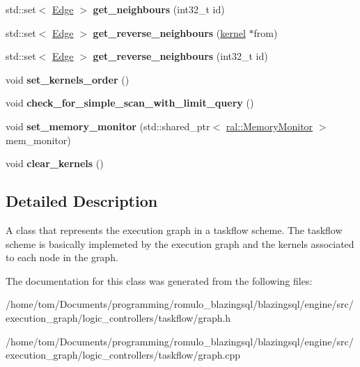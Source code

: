 \begin{DoxyCompactItemize}
\item 
\mbox{\label{classral_1_1cache_1_1graph_a1033a6785724eece7f7d9f6db1cec377}} 
std\+::set$<$ \hyperlink{structral_1_1cache_1_1graph_1_1Edge}{Edge} $>$ {\bfseries get\+\_\+neighbours} (int32\+\_\+t id)
\item 
\mbox{\label{classral_1_1cache_1_1graph_a2b51ef8a39906835c618f9fe2e886aac}} 
std\+::set$<$ \hyperlink{structral_1_1cache_1_1graph_1_1Edge}{Edge} $>$ {\bfseries get\+\_\+reverse\+\_\+neighbours} (\hyperlink{classral_1_1cache_1_1kernel}{kernel} $\ast$from)
\item 
\mbox{\label{classral_1_1cache_1_1graph_a891d2dbc52adb2f357de241b813458b9}} 
std\+::set$<$ \hyperlink{structral_1_1cache_1_1graph_1_1Edge}{Edge} $>$ {\bfseries get\+\_\+reverse\+\_\+neighbours} (int32\+\_\+t id)
\item 
\mbox{\label{classral_1_1cache_1_1graph_ad798a6ffb25cf4be31d95ce853e19756}} 
void {\bfseries set\+\_\+kernels\+\_\+order} ()
\item 
\mbox{\label{classral_1_1cache_1_1graph_aea83249dae61539588a5bd280d8ee505}} 
void {\bfseries check\+\_\+for\+\_\+simple\+\_\+scan\+\_\+with\+\_\+limit\+\_\+query} ()
\item 
\mbox{\label{classral_1_1cache_1_1graph_aed7ab03ff8896d49b235a7a781e3a9aa}} 
void {\bfseries set\+\_\+memory\+\_\+monitor} (std\+::shared\+\_\+ptr$<$ \hyperlink{classral_1_1MemoryMonitor}{ral\+::\+Memory\+Monitor} $>$ mem\+\_\+monitor)
\item 
\mbox{\label{classral_1_1cache_1_1graph_a3920eaeea5e5f47cd3991cd5b23ad520}} 
void {\bfseries clear\+\_\+kernels} ()
\end{DoxyCompactItemize}


\subsection{Detailed Description}
A class that represents the execution graph in a taskflow scheme. The taskflow scheme is basically implemeted by the execution graph and the kernels associated to each node in the graph. 

The documentation for this class was generated from the following files\+:\begin{DoxyCompactItemize}
\item 
/home/tom/\+Documents/programming/romulo\+\_\+blazingsql/blazingsql/engine/src/execution\+\_\+graph/logic\+\_\+controllers/taskflow/graph.\+h\item 
/home/tom/\+Documents/programming/romulo\+\_\+blazingsql/blazingsql/engine/src/execution\+\_\+graph/logic\+\_\+controllers/taskflow/graph.\+cpp\end{DoxyCompactItemize}
